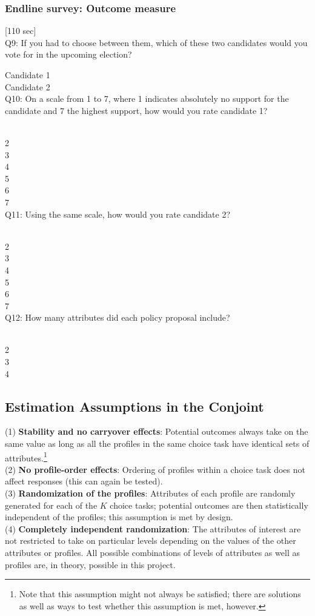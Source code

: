 \documentclass[11pt]{article}
\begin{document}
\subsubsection{Endline survey: Outcome measure}
[110 sec]\\

\noindent Q9: If you had to choose between them, which of these two candidates would you vote for in the upcoming election?

\noindent Candidate 1\\
Candidate 2\\

\noindent Q10: On a scale from 1 to 7, where 1 indicates absolutely no support for the candidate and 7 the highest support, how would you rate candidate 1?

\\
2\\
3\\
4\\
5\\
6\\
7\\

\noindent Q11: Using the same scale, how would you rate candidate 2?

\\
2\\
3\\
4\\
5\\
6\\
7\\

\noindent Q12: How many attributes did each policy proposal include?

\\
2\\
3\\
4\\


\subsection{Estimation Assumptions in the Conjoint}\label{assumptions}
(1) \textbf{Stability and no carryover effects}: Potential outcomes always take on the same value as long as all the profiles in the same choice task have identical sets of attributes.\footnote{Note that this assumption might not always be satisfied; there are solutions as well as ways to test whether this assumption is met, however.}\\
(2) \textbf{No profile-order effects}: Ordering of profiles within a choice task does not affect responses (this can again be tested).\\
(3) \textbf{Randomization of the profiles}: Attributes of each profile are randomly generated for each of the $K$ choice tasks; potential outcomes are then statistically independent of the profiles; this assumption is met by design.\\
(4) \textbf{Completely independent randomization}: The attributes of interest are not restricted to take on particular levels depending on the values of the other attributes or profiles. All possible combinations of levels of attributes as well as profiles are, in theory, possible in this project.
\end{document}
